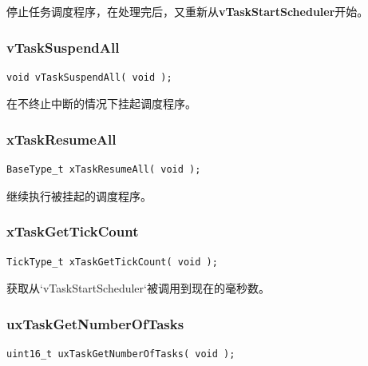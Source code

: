\documentclass[12pt, a4paper]{article}
\begin{document}
停止任务调度程序，在处理完后，又重新从\textbf{vTaskStartScheduler}开始。

\subsubsection {vTaskSuspendAll}

\begin{lstlisting}[language={[ANSI]C},keywordstyle=\color{blue!70},commentstyle=\color{red!50!green!50!blue!50},frame=shadowbox, rulesepcolor=\color{red!20!green!20!blue!20}]
void vTaskSuspendAll( void );
\end{lstlisting}

在不终止中断的情况下挂起调度程序。

\subsubsection {xTaskResumeAll}

\begin{lstlisting}[language={[ANSI]C},keywordstyle=\color{blue!70},commentstyle=\color{red!50!green!50!blue!50},frame=shadowbox, rulesepcolor=\color{red!20!green!20!blue!20}]
BaseType_t xTaskResumeAll( void );
\end{lstlisting}

继续执行被挂起的调度程序。

\subsubsection {xTaskGetTickCount}

\begin{lstlisting}[language={[ANSI]C},keywordstyle=\color{blue!70},commentstyle=\color{red!50!green!50!blue!50},frame=shadowbox, rulesepcolor=\color{red!20!green!20!blue!20}]
TickType_t xTaskGetTickCount( void );
\end{lstlisting}

获取从`vTaskStartScheduler`被调用到现在的毫秒数。

\subsubsection {uxTaskGetNumberOfTasks}

\begin{lstlisting}[language={[ANSI]C},keywordstyle=\color{blue!70},commentstyle=\color{red!50!green!50!blue!50},frame=shadowbox, rulesepcolor=\color{red!20!green!20!blue!20}]
uint16_t uxTaskGetNumberOfTasks( void );
\end{lstlisting}
\end{document}
